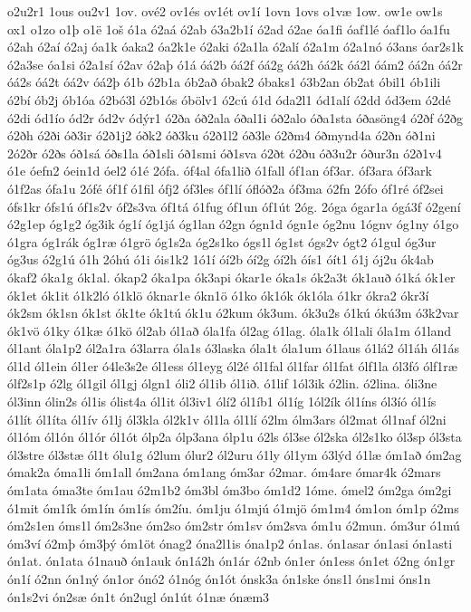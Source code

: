 {o2u2r1
1ous
ou2v1
1ov.
ové2
ov1és
ov1ét
ov1í
1ovn
1ovs
o1væ
1ow.
ow1e
ow1s
ox1
o1zo
o1þ
o1ë
1oš
ó1a
ó2aá
ó2ab
ó3a2b1í
ó2ad
ó2ae
óa1fi
óaf1lé
óaf1lo
óa1fu
ó2ah
ó2aí
ó2aj
óa1k
óaka2
óa2k1e
ó2aki
ó2a1la
ó2alí
ó2a1m
ó2a1nó
ó3ans
óar2s1k
ó2a3se
óa1si
ó2a1sí
ó2av
ó2aþ
ó1á
óá2b
óá2f
óá2g
óá2h
óá2k
óá2l
óám2
óá2n
óá2r
óá2s
óá2t
óá2v
óá2þ
ó1b
ó2b1a
ób2að
óbak2
óbaks1
ó3b2an
ób2at
óbil1
ób1ili
ó2bí
ób2j
ób1óa
ó2bó3l
ó2b1ós
óbölv1
ó2cú
ó1d
óda2l1
ód1alí
ó2dd
ód3em
ó2dé
ó2di
ód1ío
ód2r
ód2v
ódýr1
ó2ða
óð2ala
óðal1i
óð2alo
óða1sta
óðasöng4
ó2ðf
ó2ðg
ó2ðh
ó2ði
óð3ir
ó2ð1j2
óðk2
óð3ku
ó2ð1l2
óð3le
ó2ðm4
óðmynd4a
ó2ðn
óð1ni
2ó2ðr
ó2ðs
óð1sá
óðs1la
óð1sli
óð1smi
óð1sva
ó2ðt
ó2ðu
óð3u2r
óður3n
ó2ð1v4
ó1e
óefn2
óein1d
óel2
ó1é
2ófa.
óf4al
ófa1lið
ó1fall
óf1an
óf3ar.
óf3ara
óf3ark
ó1f2as
ófa1u
2ófé
óf1f
ó1fil
ófj2
óf3les
óf1lí
óflóð2a
óf3ma
ó2fn
2ófo
óf1ré
óf2sei
ófs1kr
ófs1ú
óf1s2v
óf2s3va
óf1tá
ó1fug
óf1un
óf1út
2óg.
2óga
ógar1a
ógá3f
ó2gení
ó2g1ep
óg1g2
óg3ik
óg1í
óg1já
óg1lan
ó2gn
ógn1d
ógn1e
óg2nu
1ógnv
óg1ny
ó1go
ó1gra
óg1rák
óg1ræ
ó1grö
óg1s2a
óg2s1ko
ógs1l
óg1st
ógs2v
ógt2
ó1gul
óg3ur
óg3us
ó2g1ú
ó1h
2óhú
ó1i
óis1k2
1ó1í
óí2b
óí2g
óí2h
óís1
óít1
ó1j
ój2u
ók4ab
ókaf2
óka1g
ók1al.
ókap2
óka1pa
ók3api
ókar1e
óka1s
ók2a3t
ók1auð
ó1ká
ók1er
ók1et
ók1it
ó1k2ló
ó1klö
óknar1e
ókn1ö
ó1ko
ók1ók
ók1óla
ó1kr
ókra2
ókr3í
ók2sm
ók1sn
ók1st
ók1te
ók1tú
ók1u
ó2kum
ók3um.
ók3u2s
ó1kú
ókú3m
ó3k2var
ók1vö
ó1ky
ó1kæ
ó1kö
ól2ab
ól1að
óla1fa
ól2ag
ó1lag.
óla1k
ól1ali
óla1m
ó1land
ól1ant
óla1p2
ól2a1ra
ó3larra
óla1s
ó3laska
óla1t
óla1um
ó1laus
ó1lá2
ól1áh
ól1ás
ól1d
ól1ein
ól1er
ó4le3s2e
ól1ess
ól1eyg
ól2é
ól1fal
ól1far
ól1fat
ólf1la
ól3fó
ólf1ræ
ólf2s1p
ó2lg
ól1gil
ól1gj
ólgn1
óli2
ól1ib
ól1ið.
ó1lif
1ól3ik
ó2lin.
ó2lina.
óli3ne
ól3inn
ólin2s
ól1is
ólist4a
ól1it
ól3iv1
ólí2
ól1íb1
ól1íg
1ól2ík
ól1íns
ól3íó
ól1ís
ó1lít
ól1íta
ól1ív
ó1lj
ól3kla
ól2k1v
ól1la
ól1lí
ó2lm
ólm3ars
ól2mat
ól1naf
ól2ni
ól1óm
ól1ón
ól1ór
ól1ót
ólp2a
ólp3ana
ólp1u
ó2ls
ól3se
ól2ska
ól2s1ko
ól3sp
ól3sta
ól3stre
ól3stæ
ól1t
ólu1g
ó2lum
ólur2
ól2uru
ó1ly
ól1ym
ó3lýd
ó1læ
óm1að
óm2ag
ómak2a
óma1li
óm1all
óm2ana
óm1ang
óm3ar
ó2mar.
óm4are
ómar4k
ó2mars
óm1ata
óma3te
óm1au
ó2m1b2
óm3bl
óm3bo
óm1d2
1óme.
ómel2
óm2ga
óm2gi
ó1mit
óm1ík
óm1ín
óm1ís
óm2íu.
óm1ju
ó1mjú
ó1mjö
óm1m4
óm1on
óm1p
ó2ms
óm2s1en
óms1l
óm2s3ne
óm2so
óm2str
óm1sv
óm2sva
óm1u
ó2mun.
óm3ur
ó1mú
óm3ví
ó2mþ
óm3þý
óm1öt
ónag2
óna2l1is
óna1p2
ón1as.
ón1asar
ón1asi
ón1asti
ón1at.
ón1ata
ó1nauð
ón1auk
ón1á2h
ón1ár
ó2nb
ón1er
ón1ess
ón1et
ó2ng
ón1gr
ón1í
ó2nn
ón1ný
ón1or
ónó2
ó1nóg
ón1ót
ónsk3a
ón1ske
óns1l
óns1mi
óns1n
ón1s2vi
ón2sæ
ón1t
ón2ugl
ón1út
ó1næ
ónæm3
}
